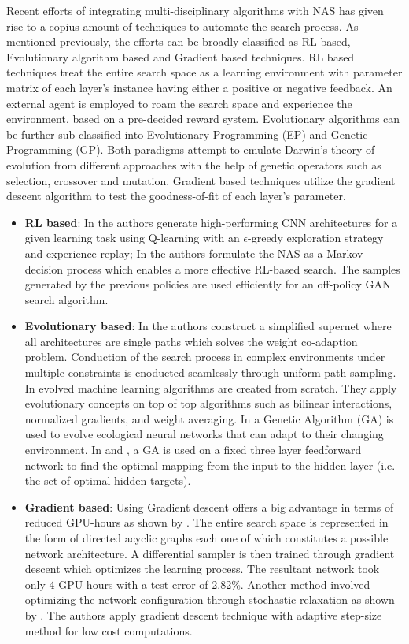 \documentclass[conference]{IEEEtran}
\begin{document}
Recent efforts of integrating multi-disciplinary algorithms with NAS has given rise to a copius amount of techniques to automate the search process. As mentioned previously, the efforts can be broadly classified as RL based, Evolutionary algorithm based and Gradient based techniques. RL based techniques treat the entire search space as a learning environment with parameter matrix of each layer's instance having either a positive or negative feedback. An external agent is employed to roam the search space and experience the environment, based on a pre-decided reward system. Evolutionary algorithms can be further sub-classified into Evolutionary Programming (EP) and Genetic Programming (GP). Both paradigms attempt to emulate Darwin's theory of evolution from different approaches with the help of genetic operators such as selection, crossover and mutation. Gradient based techniques utilize the gradient descent algorithm to test the goodness-of-fit of each layer's parameter.  

\begin{itemize}
\item \textbf{RL based}: In \cite{RWRL1} the authors generate high-performing CNN architectures for a given learning task using Q-learning with an $\epsilon$-greedy exploration strategy and experience replay; In \cite{RWRL2} the authors formulate the NAS as a Markov decision process which enables a more effective RL-based search. The samples generated by the previous policies are used efficiently for an off-policy GAN search algorithm.
\item \textbf{Evolutionary based}: In \cite{EA1} the authors construct a simplified supernet where all architectures are single paths which solves the weight co-adaption problem. Conduction of the search process in complex environments under multiple constraints is cnoducted seamlessly through uniform path sampling. In \cite{EA2} evolved machine learning algorithms are created from scratch. They apply evolutionary concepts on top of top algorithms such as bilinear interactions, normalized gradients, and weight averaging. In \cite{lund} a Genetic Algorithm (GA) is used to evolve ecological neural networks that can adapt to their changing environment. In \cite{hass} and \cite{munro}, a GA is used on a fixed three layer feedforward network to find the optimal mapping from the input to the hidden layer (i.e. the set of optimal hidden targets). 
\item \textbf{Gradient based}: Using Gradient descent offers a big advantage in terms of reduced GPU-hours as shown by \cite{GD1}. The entire search space is represented in the form of directed acyclic graphs each one of which constitutes a possible network architecture. A differential sampler is then trained through gradient descent which optimizes the learning process. The resultant network took only 4 GPU hours with a test error of 2.82\%. Another method involved optimizing the network configuration through stochastic relaxation as shown by \cite{GD2}. The authors apply gradient descent technique with adaptive step-size method for low cost computations.    



\end{itemize}
\end{document}
